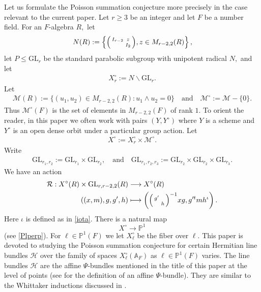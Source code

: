 \documentclass[12pt]{amsart}
\theoremstyle{remark}
\numberwithin{equation}{section}
\newcommand{\A}{\mathbb{A}}
\newcommand{\GL}{\mathrm{GL}}
\newcommand{\lto}{\longrightarrow}
\theoremstyle{definition}
\newenvironment{psmatrix}
  {\left(\begin{smallmatrix}}
  {\end{smallmatrix}\right)}
\numberwithin{equation}{subsection}
\begin{document}
Let us formulate the Poisson summation conjecture more precisely in the case relevant to the current paper.  Let $r\ge 3$ be an integer and let $F$ be a number field. For an $F$-algebra $R,$ let 
\begin{align*}
N(R):=\left\{\begin{psmatrix} I_{r-2} & z \\ & I_2 \end{psmatrix},z \in  M_{r-2,2}(R)\right\},
\end{align*}
let $P \leq \GL_{r}$ be the standard parabolic subgroup with unipotent radical $N,$
and let 
\begin{align} \label{XP}
    X^\circ_r:=N \backslash \GL_{r}.
\end{align}
Let 
\begin{align} \label{Mvee}  
    \mathcal{M}(R):=\{(u_1,u_2) \in M_{r-2,2}(R): u_1 \wedge u_2=0\}\quad\textrm{and}\quad   \mathcal{M}^{ \circ}:=\mathcal{M}-\{0\}. 
\end{align}
Thus $\mathcal{M}^\circ(F)$  is the set of elements in $M_{r-2,2}(F)$ of rank $1.$    To orient the reader, 
in this paper we often work with pairs $(Y,Y^{\circ})$ where
$Y$ is a scheme and $Y^{\circ}$ is an open dense orbit under a particular group action.
Let 
\begin{align*}
X^\circ:=X_r^\circ \times \mathcal{M}^\circ.
\end{align*}
Write
\begin{align} \label{GLr1r2}
\GL_{r_1,r_2}:=\GL_{r_1} \times \GL_{r_2}, \quad\textrm{and}\quad \GL_{r_1,r_2,r_3}:=\GL_{r_2} \times \GL_{r_2} \times \GL_{r_3}.
\end{align}
We have an action 
\begin{align*} \begin{split}
 \mathcal{R}:   X^\circ(R) \times \GL_{r,r-2,2}(R) &\lto X^\circ(R)\\
    ((x,m),g,g',h) &\longmapsto \left( \begin{psmatrix} g' & \\ & h \end{psmatrix}^{-1}xg,g'^tmh^{\iota}\right). \end{split}
\end{align*}
Here $\iota$ is defined as in \eqref{iota}.
There is a natural map
$$
 X^\circ \lto \mathbb{P}^1
$$
(see \eqref{Plperp}).
For $\ell \in \mathbb{P}^1(F)$ we let  $X^{\circ}_{\ell}$ be the fiber over $\ell.$
This paper is devoted to studying the Poisson summation conjecture for certain Hermitian line bundles $\mathcal{H}$ over the family of spaces $X^\circ_\ell(\A_F) $
as $\ell \in \mathbb{P}^1(F)$ varies.   The line bundles $\mathcal{H}$ are the affine $\Psi$-bundles mentioned in the title of this paper at the level of points (see \cite{GGHL} for the definition of an affine $\Psi$-bundle).  They are similar to the Whittaker inductions discussed in \cite{SV}.
\end{document}
